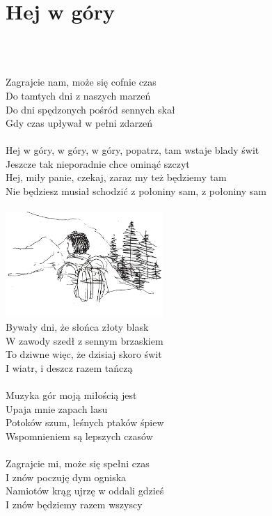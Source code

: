 \documentclass[a5paper, 10pt]{book}
\begin{document}
\section{Hej w góry}\textcolor{lightgray}{\textit{}}\\~\\
\begin{minipage}[t]{0.9\textwidth}
  Zagrajcie nam, może się cofnie czas\\
  Do tamtych dni z naszych marzeń\\
  Do dni spędzonych pośród sennych skał\\
  Gdy czas upływał w pełni zdarzeń\\
  \\
  \hspace*{3mm}Hej w góry, w góry, w góry, popatrz, tam wstaje blady świt\\
  \hspace*{3mm}Jeszcze tak nieporadnie chce ominąć szczyt\\
  \hspace*{3mm}Hej, miły panie, czekaj, zaraz my też będziemy tam\\
  \hspace*{3mm}Nie będziesz musiał schodzić z połoniny sam, z połoniny sam\\
  \\
  \includegraphics[height=40mm, right]{images/hej_w_gory.png}\vspace*{-40mm}\\
  Bywały dni, że słońca złoty blask\\
  W zawody szedł z sennym brzaskiem\\
  To dziwne więc, że dzisiaj skoro świt\\
  I wiatr, i deszcz razem tańczą\\
  \\
  Muzyka gór moją miłością jest\\
  Upaja mnie zapach lasu\\
  Potoków szum, leśnych ptaków śpiew\\
  Wspomnieniem są lepszych czasów\\
  \\
  Zagrajcie mi, może się spełni czas\\
  I znów poczuję dym ogniska\\
  Namiotów krąg ujrzę w oddali gdzieś\\
  I znów będziemy razem wszyscy\\
\end{minipage}
\end{document}
